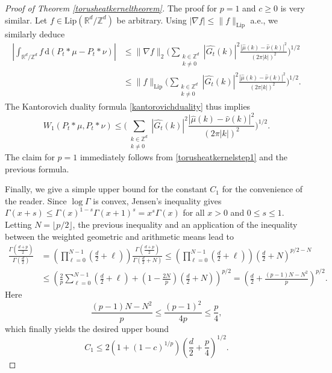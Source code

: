 \documentclass[11pt,a4paper]{article}
\theoremstyle{definition}
\begin{document}
\begin{proof}[Proof of Theorem \ref{torusheatkerneltheorem}]
The proof for $p=1$ and $c \ge 0$ is very similar. Let $f \in \mathrm{Lip}(\mathbb{R}^d / \mathbb{Z}^d)$ be arbitrary. Using $|\nabla f| \le \| f \|_{\mathrm{Lip}}$ a.e., we similarly deduce
\[ \begin{split} \left| \int_{\mathbb{R}^d / \mathbb{Z}^d} f \, \mathrm{d} (P_t *\mu - P_t *\nu) \right| &\le \| \nabla f \|_2 \Bigg( \sum_{\substack{k \in \mathbb{Z}^d \\ k \neq 0}} |\widehat{G_t}(k)|^2 \frac{|\widehat{\mu}(k) - \widehat{\nu}(k)|^2}{(2 \pi |k|)^2} \Bigg)^{1/2} \\ &\le \| f \|_{\mathrm{Lip}} \Bigg( \sum_{\substack{k \in \mathbb{Z}^d \\ k \neq 0}} |\widehat{G_t}(k)|^2 \frac{|\widehat{\mu}(k) - \widehat{\nu}(k)|^2}{(2 \pi |k|)^2} \Bigg)^{1/2}. \end{split} \]
The Kantorovich duality formula \eqref{kantorovichduality} thus implies
\[ W_1 (P_t *\mu, P_t *\nu) \le \Bigg( \sum_{\substack{k \in \mathbb{Z}^d \\ k \neq 0}} |\widehat{G_t}(k)|^2 \frac{|\widehat{\mu}(k) - \widehat{\nu}(k)|^2}{(2 \pi |k|)^2} \Bigg)^{1/2} . \]
The claim for $p=1$ immediately follows from \eqref{torusheatkernelstep1} and the previous formula.

Finally, we give a simple upper bound for the constant $C_1$ for the convenience of the reader. Since $\log \Gamma$ is convex, Jensen's inequality gives $\Gamma(x+s) \le \Gamma (x)^{1-s} \Gamma(x+1)^s = x^s \Gamma(x)$ for all $x>0$ and $0 \le s \le 1$. Letting $N=\lfloor p/2 \rfloor$, the previous inequality and an application of the inequality between the weighted geometric and arithmetic means lead to
\[ \begin{split} \frac{\Gamma \left( \frac{d+p}{2} \right)}{\Gamma \left( \frac{d}{2} \right)} &= \left( \prod_{\ell=0}^{N-1} \left( \frac{d}{2} +\ell \right) \right) \frac{\Gamma \left( \frac{d+p}{2} \right)}{\Gamma \left( \frac{d}{2}+N \right)} \le \left( \prod_{\ell=0}^{N-1} \left( \frac{d}{2} +\ell \right) \right) \left( \frac{d}{2} +N \right)^{p/2-N} \\ &\le \left( \frac{2}{p} \sum_{\ell=0}^{N-1} \left( \frac{d}{2} + \ell \right) + \left( 1- \frac{2N}{p} \right) \left( \frac{d}{2} + N \right) \right)^{p/2} = \left( \frac{d}{2} + \frac{(p-1)N-N^2}{p} \right)^{p/2} . \end{split} \]
Here
\[ \frac{(p-1)N - N^2}{p} \le \frac{(p-1)^2}{4p} \le \frac{p}{4}, \]
which finally yields the desired upper bound
\[ C_1 \le 2 (1+(1-c)^{1/p}) \left( \frac{d}{2} + \frac{p}{4} \right)^{1/2}. \]
\end{proof}
\end{document}
